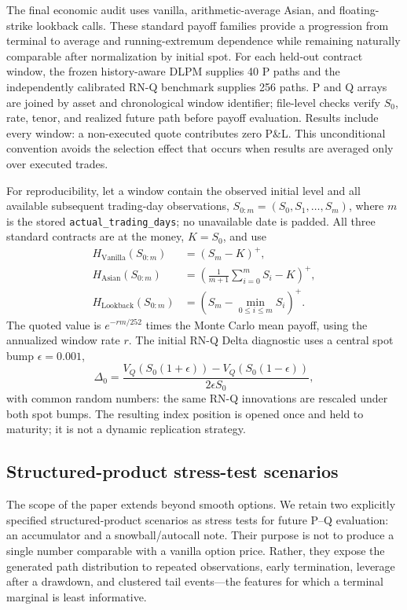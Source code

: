 ﻿\documentclass[12pt,letterpaper]{article}
\begin{document}
The final economic audit uses vanilla, arithmetic-average Asian, and
floating-strike lookback calls. These standard payoff families provide a
progression from terminal to average and running-extremum dependence while
remaining naturally comparable after normalization by initial spot. For each held-out contract window, the frozen
history-aware DLPM supplies 40 P paths and the independently calibrated RN-Q
benchmark supplies 256 paths. P and Q arrays are joined by
asset and chronological window identifier; file-level checks verify $S_0$,
rate, tenor, and realized future path before payoff evaluation. Results include
every window: a non-executed quote contributes zero P\&L. This unconditional
convention avoids the selection effect that occurs when results are averaged
only over executed trades.

For reproducibility, let a window contain the observed initial level and all
available subsequent trading-day observations,
$S_{0:m}=(S_0,S_1,\ldots,S_m)$, where $m$ is the stored
\texttt{actual\_trading\_days}; no unavailable date is padded. All three
standard contracts are at the money, $K=S_0$, and use
\begin{align}
H_{\mathrm{Vanilla}}(S_{0:m})
  &= (S_m-K)^+,\\
H_{\mathrm{Asian}}(S_{0:m})
  &= \left(\frac{1}{m+1}\sum_{i=0}^{m}S_i-K\right)^+,\\
H_{\mathrm{Lookback}}(S_{0:m})
  &= \left(S_m-\min_{0\le i\le m}S_i\right)^+.
\end{align}
The quoted value is $e^{-r m/252}$ times the Monte Carlo mean payoff, using
the annualized window rate $r$. The initial RN-Q Delta diagnostic uses a
central spot bump $\epsilon=0.001$,
\begin{equation}
\Delta_0=\frac{V_Q(S_0(1+\epsilon))-V_Q(S_0(1-\epsilon))}
{2\epsilon S_0},
\end{equation}
with common random numbers: the same RN-Q innovations are rescaled under both
spot bumps. The resulting index position is opened once and held to maturity;
it is not a dynamic replication strategy.

\subsection{Structured-product stress-test scenarios}

The scope of the paper extends beyond smooth options. We retain two explicitly
specified structured-product scenarios as stress tests for future P--Q
evaluation: an accumulator and a snowball/autocall note. Their purpose is not
to produce a single number comparable with a vanilla option price. Rather, they
expose the generated path distribution to repeated observations, early
termination, leverage after a drawdown, and clustered tail events---the
features for which a terminal marginal is least informative.
\end{document}
